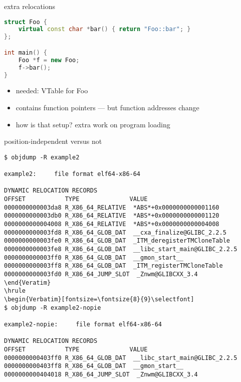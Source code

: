 \begin{frame}[fragile,label=relocVTable]{extra relocations}
\begin{lstlisting}[language=C++,style=smaller]
struct Foo {
    virtual const char *bar() { return "Foo::bar"; }
};

int main() {
    Foo *f = new Foo;
    f->bar();
}
\end{lstlisting}
\begin{itemize}
\item needed: VTable for Foo
\item contains function pointers --- but function addresses change
\item how is that setup? extra work on program loading
\end{itemize}
\end{frame}

\begin{frame}[fragile,label=relocVTable2]{position-independent versus not}
\begin{Verbatim}[fontsize=\fontsize{8}{9}\selectfont]
$ objdump -R example2

example2:     file format elf64-x86-64

DYNAMIC RELOCATION RECORDS
OFFSET           TYPE              VALUE 
0000000000003da8 R_X86_64_RELATIVE  *ABS*+0x0000000000001160
0000000000003db0 R_X86_64_RELATIVE  *ABS*+0x0000000000001120
0000000000004008 R_X86_64_RELATIVE  *ABS*+0x0000000000004008
0000000000003fd8 R_X86_64_GLOB_DAT  __cxa_finalize@GLIBC_2.2.5
0000000000003fe0 R_X86_64_GLOB_DAT  _ITM_deregisterTMCloneTable
0000000000003fe8 R_X86_64_GLOB_DAT  __libc_start_main@GLIBC_2.2.5
0000000000003ff0 R_X86_64_GLOB_DAT  __gmon_start__
0000000000003ff8 R_X86_64_GLOB_DAT  _ITM_registerTMCloneTable
0000000000003fd0 R_X86_64_JUMP_SLOT  _Znwm@GLIBCXX_3.4
\end{Veratim}
\hrule
\begin{Verbatim}[fontsize=\fontsize{8}{9}\selectfont]
$ objdump -R example2-nopie

example2-nopie:     file format elf64-x86-64

DYNAMIC RELOCATION RECORDS
OFFSET           TYPE              VALUE 
0000000000403ff0 R_X86_64_GLOB_DAT  __libc_start_main@GLIBC_2.2.5
0000000000403ff8 R_X86_64_GLOB_DAT  __gmon_start__
0000000000404018 R_X86_64_JUMP_SLOT  _Znwm@GLIBCXX_3.4
\end{Verbatim}
\end{frame}

